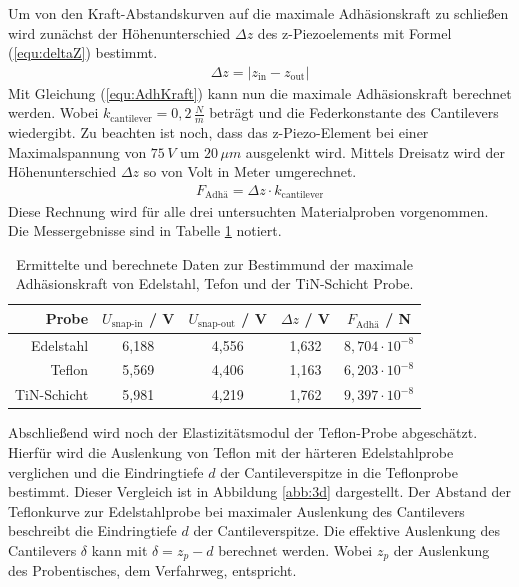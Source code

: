 Um von den Kraft-Abstandskurven auf die maximale Adh\"asionskraft zu schlie{\ss}en wird zun\"achst der Höhenunterschied $\Delta z$ des z-Piezoelements mit Formel (\ref{equ:deltaZ}) bestimmt.
\begin{align}
	\Delta z = \left\vert z_{\text{in}} - z_{\text{out}} \right\vert
\label{equ:deltaZ}
\end{align}
Mit Gleichung (\ref{equ:AdhKraft}) kann nun die maximale Adh\"asionskraft berechnet werden.
Wobei $k_{\text{cantilever}} = 0,2 \, \frac{N}{m}$ betr\"agt und die Federkonstante des Cantilevers wiedergibt.
Zu beachten ist noch, dass das z-Piezo-Element bei einer Maximalspannung von $75 \, V$ um $20 \, \mu m$ ausgelenkt wird.
Mittels Dreisatz wird der Höhenunterschied $\Delta z$ so von Volt in Meter umgerechnet.
\begin{align}
	F_{\text{Adh\"a}} = \Delta z \cdot k_{\text{cantilever}}
\label{equ:AdhKraft}
\end{align}
Diese Rechnung wird f\"ur alle drei untersuchten Materialproben vorgenommen.
Die Messergebnisse sind in Tabelle \ref{tab:auf3} notiert.
\begin{table}
	\centering
	\caption{Ermittelte und berechnete Daten zur Bestimmund der maximale Adhäsionskraft von Edelstahl, Tefon und der TiN-Schicht Probe.}
\begin{tabular}{|r|cccc|}
	\hline
	{Probe} & {$U_{\text{snap-in}}$} / V & {$U_{\text{snap-out}}$} / V & $\Delta z$ / V & {$F_{\text{Adh\"a}}$} / N \\
	\hline
	Edelstahl & 6,188 & 4,556 & 1,632 & $8,704 \cdot 10^{-8}$ \\
	Teflon	& 5,569 & 4,406 & 1,163 & $6,203 \cdot 10^{-8}$ \\
	TiN-Schicht & 5,981 & 4,219 & 1,762 & $9,397 \cdot 10^{-8}$ \\
	\hline
\end{tabular}
\label{tab:auf3}
\end{table}
Abschlie{\ss}end wird noch der Elastizitätsmodul der Teflon-Probe abgesch\"atzt.
Hierf\"ur wird die Auslenkung von Teflon mit der h\"arteren Edelstahlprobe verglichen und die Eindringtiefe $d$ der Cantileverspitze in die Teflonprobe bestimmt.
Dieser Vergleich ist in Abbildung \ref{abb:3d} dargestellt.
Der Abstand der Teflonkurve zur Edelstahlprobe bei maximaler Auslenkung des Cantilevers beschreibt die Eindringtiefe $d$ der Cantileverspitze.
Die effektive Auslenkung des Cantilevers $\delta$ kann mit $\delta = z_p - d$ berechnet werden.
Wobei $z_p$ der Auslenkung des Probentisches, dem Verfahrweg, entspricht.
